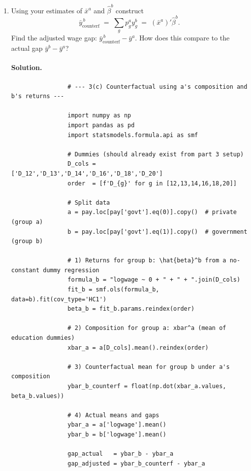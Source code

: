 \documentclass[12pt]{article}
\numberwithin{equation}{section}
\newcommand{\solution}{\paragraph{Solution.}}
\begin{document}
\begin{enumerate}[leftmargin=2em]
\begin{enumerate}[label=(\alph*),leftmargin=1.6em]
    
    \item Using your estimates of $\bar{x}^a$ and $\hat{\beta}^b$ construct
    \[
      \bar{y}_{\text{counterf}}^{\,b} \;=\; \sum_g p_g^a y_g^b \;=\; (\bar{x}^a)'\hat{\beta}^b.
    \]
    Find the adjusted wage gap: $\bar{y}_{\text{counterf}}^{\,b}-\bar{y}^a$. How does this compare to the actual gap $\bar{y}^b-\bar{y}^a$?

    \solution
        \begin{listing}[H]
            \begin{verbatim}
                # --- 3(c) Counterfactual using a's composition and b's returns ---
                
                import numpy as np
                import pandas as pd
                import statsmodels.formula.api as smf
                
                # Dummies (should already exist from part 3 setup)
                D_cols = ['D_12','D_13','D_14','D_16','D_18','D_20']
                order  = [f'D_{g}' for g in [12,13,14,16,18,20]]
                
                # Split data
                a = pay.loc[pay['govt'].eq(0)].copy()  # private (group a)
                b = pay.loc[pay['govt'].eq(1)].copy()  # government (group b)
                
                # 1) Returns for group b: \hat{beta}^b from a no-constant dummy regression
                formula_b = "logwage ~ 0 + " + " + ".join(D_cols)
                fit_b = smf.ols(formula_b, data=b).fit(cov_type='HC1')
                beta_b = fit_b.params.reindex(order)
                
                # 2) Composition for group a: xbar^a (mean of education dummies)
                xbar_a = a[D_cols].mean().reindex(order)
                
                # 3) Counterfactual mean for group b under a's composition
                ybar_b_counterf = float(np.dot(xbar_a.values, beta_b.values))
                
                # 4) Actual means and gaps
                ybar_a = a['logwage'].mean()
                ybar_b = b['logwage'].mean()
                
                gap_actual   = ybar_b - ybar_a
                gap_adjusted = ybar_b_counterf - ybar_a
                \end{verbatim}
                \caption{Code (Part 1): Counterfactual setup, returns, composition, and adjusted gap.}
                \end{listing}
                

\end{enumerate}
\end{enumerate}
\end{document}
